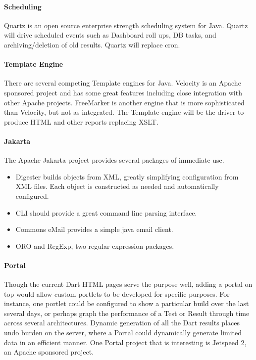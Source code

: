\documentclass{InsightBook}
\begin{document}
\paragraph{Scheduling}
Quartz is an open source enterprise strength
scheduling system for Java.  Quartz will drive scheduled events such
as Dashboard roll ups, DB tasks, and archiving/deletion of old
results.  Quartz will replace cron.

\paragraph{Template Engine}
There are several competing Template engines for Java.  Velocity is an
Apache sponsored project and has some great features including close
integration with other Apache projects.  FreeMarker is another engine
that is more sophisticated than Velocity, but not as integrated.  The
Template engine will be the driver to produce HTML and other reports
replacing XSLT.

\paragraph{Jakarta}  The Apache Jakarta project provides several
packages of immediate use.
\begin{itemize}
\item Digester builds objects from XML,
greatly simplifying configuration from XML files.  Each object is
constructed as needed and automatically configured.
\item CLI should provide a great command line parsing interface.
\item Commons eMail provides a simple java email client.
\item ORO and RegExp, two regular expression packages.
\end{itemize}

\paragraph{Portal}  Though the current Dart HTML pages serve the
purpose well, adding a portal on top would allow custom portlets to be
developed for specific purposes.  For instance, one portlet could be
configured to show a particular build over the last several days, or
perhaps graph the performance of a Test or Result through time across
several architectures.  Dynamic generation of all the Dart results
places undo burden on the server, where a Portal could dynamically
generate limited data in an efficient manner.  One Portal project that
is interesting is Jetspeed 2, an Apache sponsored project.
\end{document}
